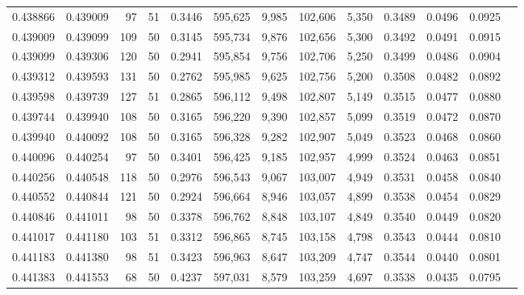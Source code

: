 \begin{tabular}{rrrrrrrrrrrrr}
0.438866 & 0.439009 &    97 &  51 &                                     0.3446 & 595,625 &   9,985 & 102,606 &   5,350 & 0.3489 & 0.0496 & 0.0925 \\
0.439009 & 0.439099 &   109 &  50 &                                     0.3145 & 595,734 &   9,876 & 102,656 &   5,300 & 0.3492 & 0.0491 & 0.0915 \\
0.439099 & 0.439306 &   120 &  50 &                                     0.2941 & 595,854 &   9,756 & 102,706 &   5,250 & 0.3499 & 0.0486 & 0.0904 \\
0.439312 & 0.439593 &   131 &  50 &                                     0.2762 & 595,985 &   9,625 & 102,756 &   5,200 & 0.3508 & 0.0482 & 0.0892 \\
0.439598 & 0.439739 &   127 &  51 &                                     0.2865 & 596,112 &   9,498 & 102,807 &   5,149 & 0.3515 & 0.0477 & 0.0880 \\
0.439744 & 0.439940 &   108 &  50 &                                     0.3165 & 596,220 &   9,390 & 102,857 &   5,099 & 0.3519 & 0.0472 & 0.0870 \\
0.439940 & 0.440092 &   108 &  50 &                                     0.3165 & 596,328 &   9,282 & 102,907 &   5,049 & 0.3523 & 0.0468 & 0.0860 \\
0.440096 & 0.440254 &    97 &  50 &                                     0.3401 & 596,425 &   9,185 & 102,957 &   4,999 & 0.3524 & 0.0463 & 0.0851 \\
0.440256 & 0.440548 &   118 &  50 &                                     0.2976 & 596,543 &   9,067 & 103,007 &   4,949 & 0.3531 & 0.0458 & 0.0840 \\
0.440552 & 0.440844 &   121 &  50 &                                     0.2924 & 596,664 &   8,946 & 103,057 &   4,899 & 0.3538 & 0.0454 & 0.0829 \\
0.440846 & 0.441011 &    98 &  50 &                                     0.3378 & 596,762 &   8,848 & 103,107 &   4,849 & 0.3540 & 0.0449 & 0.0820 \\
0.441017 & 0.441180 &   103 &  51 &                                     0.3312 & 596,865 &   8,745 & 103,158 &   4,798 & 0.3543 & 0.0444 & 0.0810 \\
0.441183 & 0.441380 &    98 &  51 &                                     0.3423 & 596,963 &   8,647 & 103,209 &   4,747 & 0.3544 & 0.0440 & 0.0801 \\
0.441383 & 0.441553 &    68 &  50 &                                     0.4237 & 597,031 &   8,579 & 103,259 &   4,697 & 0.3538 & 0.0435 & 0.0795 \\

\end{tabular}
